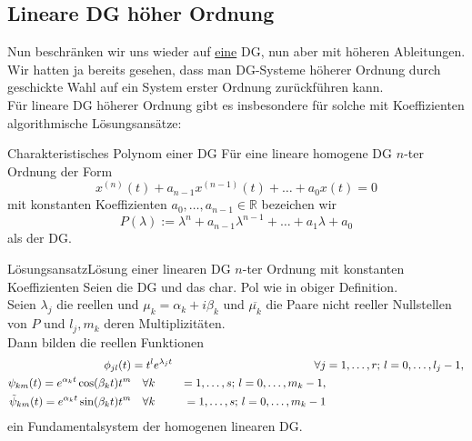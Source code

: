\subsection{Lineare DG höher Ordnung}
Nun beschränken wir uns wieder auf \underline{eine} DG, nun aber mit höheren Ableitungen.\\
Wir hatten ja bereits gesehen, dass man DG-Systeme höherer Ordnung durch geschickte Wahl auf ein System erster Ordnung zurückführen kann.\\
Für lineare DG höherer Ordnung gibt es insbesondere für solche mit  Koeffizienten algorithmische Lösungsansätze:
\begin{Def}
{Charakteristisches Polynom einer DG}
Für eine lineare homogene DG $n$-ter Ordnung der Form
\begin{equation}
    x^{(n)}(t)+a_{n-1}x^{(n-1)}(t)+\ldots+a_0x(t)=0
\end{equation}
mit konstanten Koeffizienten $a_0,\ldots,a_{n-1}\in\mathbb{R}$ bezeichen wir
\begin{equation}
    P(\lambda):=\lambda^n+a_{n-1}\lambda^{n-1}+\ldots+a_1\lambda+a_0
\end{equation}
als  der DG.
\end{Def}
\begin{Satz}
{Lösungsansatz}{Lösung einer linearen DG $n$-ter Ordnung mit konstanten Koeffizienten}
Seien die DG und das char. Pol wie in obiger Definition.\\
Seien $\lambda_j$ die reellen und $\mu_k=\alpha_k+ i\beta_k$ und $\overline{\mu_k}$ die Paare nicht reeller Nullstellen von $P$ und $l_j, m_k$ deren Multiplizitäten.\\
Dann bilden die reellen Funktionen
\begin{alignat}{3}
    \phi_{jl}(t)&=t^l e^{\lambda_j t}&\quad \forall j&=1,\ldots,r;\,l=0,\ldots,l_j-1,\\
    \psi_{km}(t)=e^{\alpha_kt}\cos(\beta_kt)t^m&\quad \forall k&=1,\ldots,s;\,l=0,\ldots,m_k-1,\\
    \Tilde{\psi}_{km}(t)=e^{\alpha_kt}\sin(\beta_kt)t^m&\quad \forall k&=1,\ldots,s;\,l=0,\ldots,m_k-1
\end{alignat}
ein Fundamentalsystem der homogenen linearen DG.
\end{Satz}
